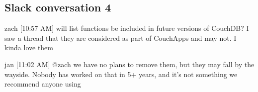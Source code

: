 \subsection{Slack conversation 4}
\label{appendix:slack4}
zach [10:57 AM]
will list functions be included in future versions of CouchDB? I saw a thread that they are considered as part of CouchApps and may not. I kinda love them

jan [11:02 AM]
@zach we have no plans to remove them, but they may fall by the wayside. Nobody has worked on that in 5+ years, and it’s not something we recommend anyone using